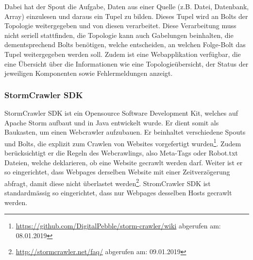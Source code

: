 Dabei hat der Spout die Aufgabe, Daten aus einer Quelle (z.B. Datei, Datenbank, Array) einzulesen und daraus ein Tupel zu bilden.
Dieses Tupel wird an Bolts der Topologie weitergegeben und von diesen verarbeitet.
Diese Verarbeitung muss nicht seriell stattfinden, die Topologie kann auch Gabelungen beinhalten, die dementsprechend Bolts benötigen, welche entscheiden, an welchen Folge-Bolt das Tupel weitergegeben werden soll.
Zudem ist eine Webapplikation verfügbar, die eine Übersicht über die Informationen wie eine Topologieübersicht, der Status der jeweiligen Komponenten sowie Fehlermeldungen anzeigt.
\subsubsection{StormCrawler SDK}
StormCrawler SDK ist ein Opensource Software Development Kit, welches auf Apache Storm aufbaut und in Java entwickelt wurde.
Er dient somit als Baukasten, um einen Webcrawler aufzubauen.
Er beinhaltet verschiedene Spouts und Bolts, die explizit zum Crawlen von Websites vorgefertigt wurden\footnote{\url{https://github.com/DigitalPebble/storm-crawler/wiki} abgerufen am: 08.01.2019}.
Zudem berücksichtigt er die Regeln des Webcrawlings, also Meta-Tags oder Robot.txt Dateien, welche deklarieren, ob eine Website gecrawlt werden darf.
Weiter ist er so eingerichtet, dass Webpages derselben Website mit einer Zeitverzögerung abfragt, damit diese nicht überlastet werden\footnote{\url{http://stormcrawler.net/faq/} abgerufen am: 09.01.2019}.
StromCrawler SDK ist standardmässig so eingerichtet, dass nur Webpages desselben Hosts gecrawlt werden.
